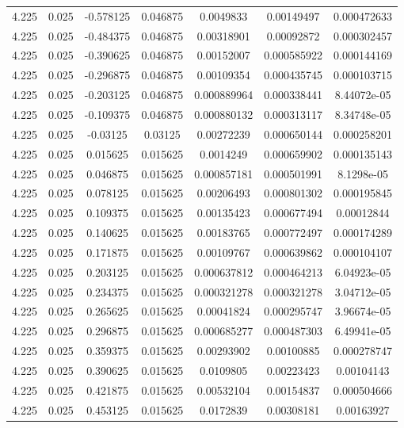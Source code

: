 \begin{table}[bh]
\begin{center}
{\begin{tabular}{ccccccc}
4.225	 & 0.025 & 	-0.578125	 & 0.046875	 & 0.0049833	 & 0.00149497	 & 0.000472633 \\ 
4.225	 & 0.025 & 	-0.484375	 & 0.046875	 & 0.00318901	 & 0.00092872	 & 0.000302457 \\ 
4.225	 & 0.025 & 	-0.390625	 & 0.046875	 & 0.00152007	 & 0.000585922	 & 0.000144169 \\ 
4.225	 & 0.025 & 	-0.296875	 & 0.046875	 & 0.00109354	 & 0.000435745	 & 0.000103715 \\ 
4.225	 & 0.025 & 	-0.203125	 & 0.046875	 & 0.000889964	 & 0.000338441	 & 8.44072e-05 \\ 
4.225	 & 0.025 & 	-0.109375	 & 0.046875	 & 0.000880132	 & 0.000313117	 & 8.34748e-05 \\ 
4.225	 & 0.025 & 	-0.03125	 & 0.03125	 & 0.00272239	 & 0.000650144	 & 0.000258201 \\ 
4.225	 & 0.025 & 	0.015625	 & 0.015625	 & 0.0014249	 & 0.000659902	 & 0.000135143 \\ 
4.225	 & 0.025 & 	0.046875	 & 0.015625	 & 0.000857181	 & 0.000501991	 & 8.1298e-05 \\ 
4.225	 & 0.025 & 	0.078125	 & 0.015625	 & 0.00206493	 & 0.000801302	 & 0.000195845 \\ 
4.225	 & 0.025 & 	0.109375	 & 0.015625	 & 0.00135423	 & 0.000677494	 & 0.00012844 \\ 
4.225	 & 0.025 & 	0.140625	 & 0.015625	 & 0.00183765	 & 0.000772497	 & 0.000174289 \\ 
4.225	 & 0.025 & 	0.171875	 & 0.015625	 & 0.00109767	 & 0.000639862	 & 0.000104107 \\ 
4.225	 & 0.025 & 	0.203125	 & 0.015625	 & 0.000637812	 & 0.000464213	 & 6.04923e-05 \\ 
4.225	 & 0.025 & 	0.234375	 & 0.015625	 & 0.000321278	 & 0.000321278	 & 3.04712e-05 \\ 
4.225	 & 0.025 & 	0.265625	 & 0.015625	 & 0.00041824	 & 0.000295747	 & 3.96674e-05 \\ 
4.225	 & 0.025 & 	0.296875	 & 0.015625	 & 0.000685277	 & 0.000487303	 & 6.49941e-05 \\ 
4.225	 & 0.025 & 	0.359375	 & 0.015625	 & 0.00293902	 & 0.00100885	 & 0.000278747 \\ 
4.225	 & 0.025 & 	0.390625	 & 0.015625	 & 0.0109805	 & 0.00223423	 & 0.00104143 \\ 
4.225	 & 0.025 & 	0.421875	 & 0.015625	 & 0.00532104	 & 0.00154837	 & 0.000504666 \\ 
4.225	 & 0.025 & 	0.453125	 & 0.015625	 & 0.0172839	 & 0.00308181	 & 0.00163927 \\ 

\end{tabular}}
\end{center}
\end{table}
